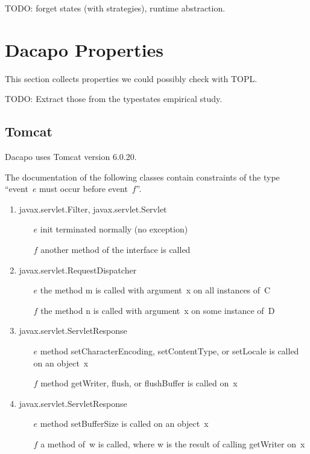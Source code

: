 \documentclass{article} %
\begin{document}
TODO: forget states (with strategies), runtime abstraction.

\section{Dacapo Properties} %

This section collects properties we could possibly check with TOPL\null.

TODO: Extract those from the typestates empirical study.

\subsection{Tomcat} %

Dacapo uses Tomcat version 6.0.20.

The documentation of the following classes contain constraints of the type ``event~$e$ must occur before event~$f$''.

\begin{enumerate}
\item
\textsf{javax.servlet.Filter}, \textsf{javax.servlet.Servlet}
  \begin{itemize}
  \item[$e$] \textsf{init} terminated normally (no exception)
  \item[$f$] another method of the interface is called
  \end{itemize}
\item
\textsf{javax.servlet.RequestDispatcher}
  \begin{itemize}
  \item[$e$] the method \textsf{m} is called with argument~\textsf{x} on all instances of~\textsf{C}
  \item[$f$] the method \textsf{n} is called with argument~\textsf{x} on some instance of~\textsf{D}
  \end{itemize}
\item
\textsf{javax.servlet.ServletResponse}
  \begin{itemize}
  \item[$e$] method \textsf{setCharacterEncoding}, \textsf{setContentType}, or \textsf{setLocale} is called on an object~\textsf{x}
  \item[$f$] method \textsf{getWriter}, \textsf{flush}, or \textsf{flushBuffer} is called on~\textsf{x}
  \end{itemize}
\item
\textsf{javax.servlet.ServletResponse}
  \begin{itemize}
  \item[$e$] method \textsf{setBufferSize} is called on an object~\textsf{x}
  \item[$f$] a method of~\textsf{w} is called, where \textsf{w} is the result of calling \textsf{getWriter} on~\textsf{x}
  \end{itemize}
\end{enumerate}
\end{document}
